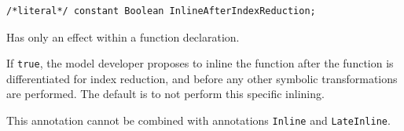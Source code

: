 \begin{annotationdefinition}[InlineAfterIndexReduction]
\begin{synopsis}\begin{lstlisting}
/*literal*/ constant Boolean InlineAfterIndexReduction;
\end{lstlisting}\end{synopsis}
\begin{semantics}
Has only an effect within a function declaration.

If {\lstinline!true!}, the model developer proposes to inline the function after the function is differentiated for index reduction, and before any other symbolic transformations are performed.
The default is to not perform this specific inlining.

This annotation cannot be combined with annotations {\lstinline!Inline!} and {\lstinline!LateInline!}.
\end{semantics}
\end{annotationdefinition}

